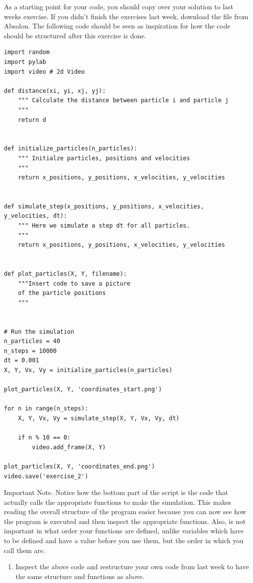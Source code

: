 \documentclass{article}
\begin{document}
As a starting point for your code, you should copy over your solution to last
weeks exercise. If you didn't finish the exercises last week, download the file
 from Absalon. The following code should be seen as
inspiration for how the code should be structured after this exercise is done.

\begin{lstlisting}
import random
import pylab
import video # 2d Video

def distance(xi, yi, xj, yj):
    """ Calculate the distance between particle i and particle j
    """
    return d


def initialize_particles(n_particles):
    """ Initialze particles, positions and velocities
    """
    return x_positions, y_positions, x_velocities, y_velocities


def simulate_step(x_positions, y_positions, x_velocities, y_velocities, dt):
    """ Here we simulate a step dt for all particles.
    """
    return x_positions, y_positions, x_velocities, y_velocities


def plot_particles(X, Y, filename):
    """Insert code to save a picture
    of the particle positions
    """


# Run the simulation
n_particles = 40
n_steps = 10000
dt = 0.001
X, Y, Vx, Vy = initialize_particles(n_particles)

plot_particles(X, Y, 'coordinates_start.png')

for n in range(n_steps):
    X, Y, Vx, Vy = simulate_step(X, Y, Vx, Vy, dt)

    if n % 10 == 0:
        video.add_frame(X, Y)

plot_particles(X, Y, 'coordinates_end.png')
video.save('exercise_2')

\end{lstlisting}

\newpage
Important Note.
Notice how the bottom part of the script is the code that actually calls the
appropriate functions to make the simulation.  This makes reading the overall
structure of the program easier because you can now see how the program is
executed and then inspect the appropriate functions.  Also, is not important
in what order your functions are defined, unlike variables which have to be
defined and have a value before you use them, but the order in which you
call them are.

\begin{enumerate}
  \setcounter{enumi}{0}
  \item Inspect the above code and restructure your own code from last week to have the
    same structure and functions as above.
\end{enumerate}
\end{document}
